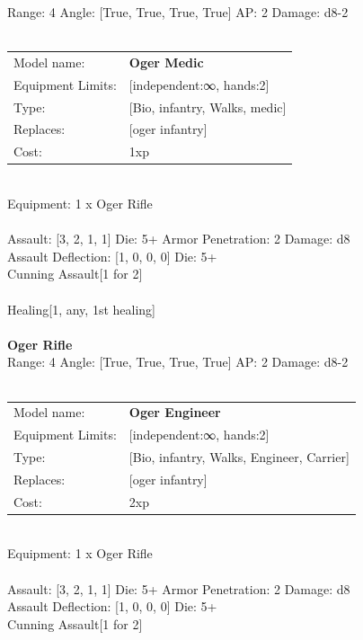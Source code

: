 Range: 4  Angle: [True, True, True, True] AP: 2 Damage: d8-2 \\




 
\ \\

\noindent
\begin{tabular}{ll}
Model name: &{\bf Oger Medic } \\
Equipment Limits: &[independent:∞, hands:2] \\
Type: &[Bio, infantry, Walks, medic] \\
Replaces: &[oger infantry] \\
Cost: & 1xp\\
\end{tabular}
\ \\
Equipment: 1 x Oger Rifle \\
\ \\
Assault: [3, 2, 1, 1] Die: 5+ Armor Penetration: 2 Damage: d8 \\
Assault Deflection: [1, 0, 0, 0] Die: 5+\\
\indent Cunning Assault[1 for 2]\\ 
 
\ \\
Healing[1, any, 1st healing]\\ 

\ \\
{\bf Oger Rifle } \\



Range: 4  Angle: [True, True, True, True] AP: 2 Damage: d8-2 \\




 
\ \\

\noindent
\begin{tabular}{ll}
Model name: &{\bf Oger Engineer } \\
Equipment Limits: &[independent:∞, hands:2] \\
Type: &[Bio, infantry, Walks, Engineer, Carrier] \\
Replaces: &[oger infantry] \\
Cost: & 2xp\\
\end{tabular}
\ \\
Equipment: 1 x Oger Rifle \\
\ \\
Assault: [3, 2, 1, 1] Die: 5+ Armor Penetration: 2 Damage: d8 \\
Assault Deflection: [1, 0, 0, 0] Die: 5+\\
\indent Cunning Assault[1 for 2]\\ 
 
